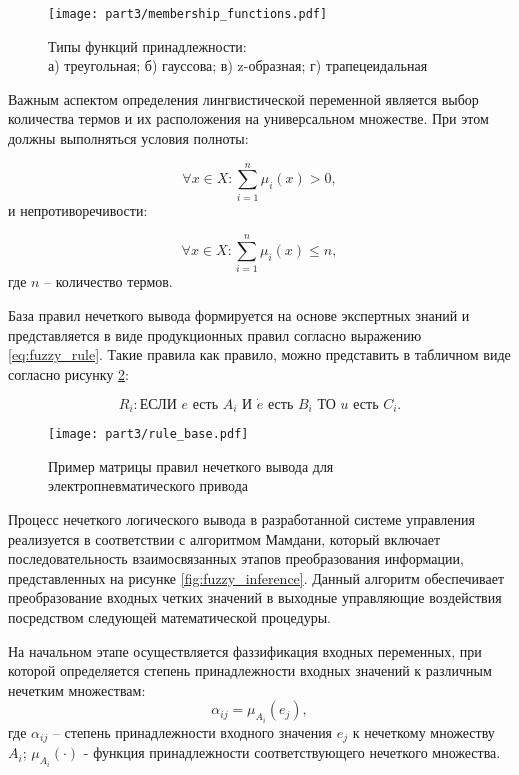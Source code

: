 \begin{figure}[ht]
	\centering
	\texttt{[image: part3/membership\_functions.pdf]}
	\caption{Типы функций принадлежности:\\
		а) треугольная; б) гауссова; в) z-образная; г) трапецеидальная}
	\label{fig:membership_functions_types}
\end{figure}

Важным аспектом определения лингвистической переменной является выбор
количества термов и их расположения
на универсальном множестве. При этом должны выполняться условия полноты:

\begin{equation}
	\forall x \in X: \sum_{i=1}^n \mu_i(x) > 0,
\end{equation}
и непротиворечивости:

\begin{equation}
	\forall x \in X: \sum_{i=1}^n \mu_i(x) \leq n,
\end{equation}
где $n$ -- количество термов.

База правил нечеткого вывода формируется на основе экспертных знаний
и представляется в виде продукционных правил согласно выражению \ref{eq:fuzzy_rule}. Такие правила как правило,
можно представить в табличном виде согласно рисунку \ref{fig:fuzzy_rules}:

\begin{equation}\label{eq:fuzzy_rule}
	R_i: \text{ЕСЛИ } e \text{ есть } A_i \text{ И } \dot{e} \text{ есть } B_i \text{ ТО } u \text{ есть } C_i.
\end{equation}

\begin{figure}[ht]
	\centering
	\texttt{[image: part3/rule\_base.pdf]}
	\caption{Пример матрицы правил нечеткого вывода для электропневматического привода}
	\label{fig:fuzzy_rules}
\end{figure}

Процесс нечеткого логического вывода в разработанной системе управления реализуется в
соответствии с алгоритмом Мамдани, который включает последовательность
взаимосвязанных этапов преобразования информации, представленных на рисунке \ref{fig:fuzzy_inference}. Данный алгоритм
обеспечивает преобразование входных четких значений в выходные управляющие воздействия посредством
следующей математической процедуры.

На начальном этапе осуществляется фаззификация входных переменных, при которой определяется
степень принадлежности входных значений к различным нечетким множествам:
\begin{equation}
	\alpha_{ij} = \mu_{A_i}(e_j),
\end{equation}
где $\alpha_{ij}$ -- степень принадлежности входного значения $e_j$ к нечеткому множеству $A_i$;
$\mu_{A_i}(\cdot)$ - функция принадлежности соответствующего нечеткого множества.

